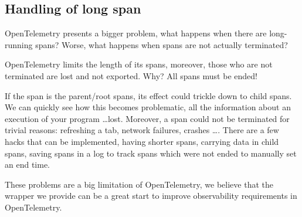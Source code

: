     \subsection{Handling of long span}
        OpenTelemetry presents a bigger problem, what happens when there are long-running spans? Worse, what happens when spans are not actually terminated?

        OpenTelemetry limits the length of its spans, moreover, those who are not terminated are lost and not exported. Why? All spans must be ended!

        If the span is the parent/root spans, its effect could trickle down to child spans. We can quickly see how this becomes problematic, all the information about an execution of your program \dots lost. Moreover, a span could not be terminated for trivial reasons: refreshing a tab, network failures, crashes \dots \cite{otel-l}. There are a few hacks that can be implemented, having shorter spans, carrying data in child spans, saving spans in a log to track spans which were not ended to manually set an end time.

        These problems are a big limitation of OpenTelemetry, we believe that the wrapper we provide can be a great start to improve observability requirements in OpenTelemetry.
